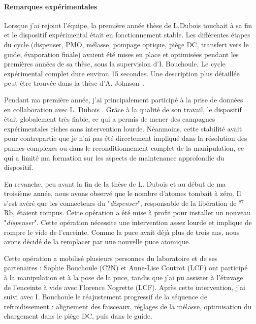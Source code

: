 \paragraph{Remarques expérimentales}
Lorsque j’ai rejoint l’équipe, la première année thèse de L.Dubois touchait à sa fin et le dispositif expérimental était en fonctionnement stable. Les différentes étapes du cycle (dispenser, \gls{PMO}, mélasse, pompage optique, piège \gls{DC}, transfert vers le guide, évaporation finale) avaient été mises en place et optimisées pendant les premières années de sa thèse, sous la supervision d’I. Bouchoule. Le cycle expérimental complet dure environ 15 secondes. Une description plus détaillée peut être trouvée dans la thèse d’A. Johnson~\cite{Johnson2016}.

\medskip

Pendant ma première année, j’ai principalement participé à la prise de données en collaboration avec L. Dubois . Grâce à la qualité de son travail, le dispositif était globalement très fiable, ce qui a permis de mener des campagnes expérimentales riches sans intervention lourde. Néanmoins, cette stabilité avait pour contrepartie que je n’ai pas été directement impliqué dans la résolution des pannes complexes ou dans le reconditionnement complet de la manipulation, ce qui a limité ma formation sur les aspects de maintenance approfondie du dispositif.

\medskip


En revanche, peu avant la fin de la thèse de L. Dubois et au début de ma troisième année, nous avons observé que le nombre d’atomes tombait à zéro. Il s’est avéré que les connecteurs du "\emph{dispenser}", responsable de la libération de $^{87}$Rb, étaient rompus. Cette opération a été mise à profit pour installer un nouveau "\emph{dispenser}". Cette opération nécessite une intervention assez lourde et implique de rompre le vide de l’enceinte. Comme la puce avait déjà plus de trois ans, nous avons décidé de la remplacer par une nouvelle puce atomique.

\medskip

Cette opération a mobilisé plusieurs personnes du laboratoire et de ses partenaires : Sophie Bouchoule (\gls{C2N}) et  Anne-Lise Coutrot (\gls{LCF}) ont participé à la manipulation et à la pose de la puce, tandis que j’ai pu assister à l’étuvage de l’enceinte à vide avec Florence Nogrette (\gls{LCF}). Après cette intervention, j’ai suivi avec I. Bouchoule le réajustement progressif de la séquence de refroidissement : alignement des faisceaux, réglages de la mélasse, optimisation du chargement dans le piège \gls{DC}, puis dans le guide.

